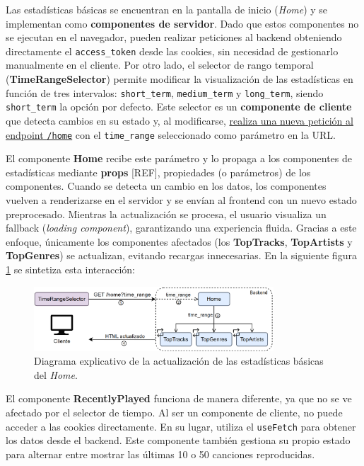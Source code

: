 Las estadísticas básicas se encuentran en la pantalla de inicio (\textit{Home}) y se implementan como \textbf{componentes de servidor}. Dado que estos componentes no se ejecutan en el navegador, pueden realizar peticiones al backend obteniendo directamente el \texttt{access\_token} desde las cookies, sin necesidad de gestionarlo manualmente en el cliente. Por otro lado, el selector de rango temporal (\textbf{TimeRangeSelector}) permite modificar la visualización de las estadísticas en función de tres intervalos: \texttt{short\_term}, \texttt{medium\_term} y \texttt{long\_term}, siendo \texttt{short\_term} la opción por defecto. Este selector es un \textbf{componente de cliente} que detecta cambios en su estado y, al modificarse, \underline{realiza una nueva petición al endpoint \texttt{/home}} con el \texttt{time\_range} seleccionado como parámetro en la URL.

El componente \textbf{Home} recibe este parámetro y lo propaga a los componentes de estadísticas mediante \textbf{props} [REF], propiedades (o parámetros) de los componentes. Cuando se detecta un cambio en los datos, los componentes vuelven a renderizarse en el servidor y se envían al frontend con un nuevo estado preprocesado. Mientras la actualización se procesa, el usuario visualiza un fallback (\textit{loading component}), garantizando una experiencia fluida. Gracias a este enfoque, únicamente los componentes afectados (los \textbf{TopTracks}, \textbf{TopArtists} y \textbf{TopGenres}) se actualizan, evitando recargas innecesarias. En la siguiente figura \ref{fig:actualizacion_tops} se sintetiza esta interacción:

\begin{figure}[H]
    \centering
    \includegraphics[width=0.8\textwidth]{figures/implementacion/actualizacion_tops.png}
    \vspace{10pt}
    \caption{Diagrama explicativo de la actualización de las estadísticas básicas del \textit{Home}.}
    \label{fig:actualizacion_tops}
\end{figure}

El componente \textbf{RecentlyPlayed} funciona de manera diferente, ya que no se ve afectado por el selector de tiempo. Al ser un componente de cliente, no puede acceder a las cookies directamente. En su lugar, utiliza el \texttt{useFetch} para obtener los datos desde el backend. Este componente también gestiona su propio estado para alternar entre mostrar las últimas 10 o 50 canciones reproducidas.

